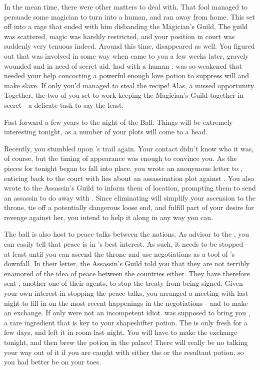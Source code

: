 \documentclass[char]{NeptuneBall}
\begin{document}
In the mean time, there were other matters to deal with. That fool \cAriel{} managed to persuade some magician to turn \cAriel{\them} into a human, and ran away from home. This set \cKing{} off into a rage that ended with him disbanding the Magician's Guild. The guild was scattered, magic was harshly restricted, and your position in court was suddenly very tenuous indeed. Around this time, \cWitch{} disappeared as well. You figured out that \cWitch{\they} was involved in some way when \cWitch{\they} came to you a few weeks later, gravely wounded and in need of secret aid. \cWitch{\They} had with \cWitch{\them} a human \cSlave{\prince}. \cWitch{} was so weakened that \cWitch{\they} needed your help concocting a powerful enough love potion to suppress \cSlave{\their} will and make \cSlave{\them} \cWitch{\them} slave. If only you'd managed to steal the recipe! Alas, a missed opportunity. Together, the two of you set to work keeping the Magician's Guild together in secret - a delicate task to say the least.

Fast forward a few years to the night of the \cExExKing{} Ball. Things will be extremely interesting tonight, as a number of your plots will come to a head.

Recently, you stumbled upon \cQueen{}'s trail again. Your contact didn't know who it was, of course, but the timing of \cQueen{\their} appearance was enough to convince you. As the pieces for tonight began to fall into place, you wrote an anonymous letter to \cQueen{}, enticing \cQueen{\them} back to the court with lies about an assassination plot against \cKing{}. You also wrote to the Assassin's Guild to inform them of \cQueen{\their} location, prompting them to send an assassin to do away with \cQueen{}. Since eliminating \cQueen{} will simplify your ascension to the throne, tie off a potentially dangerous loose end, and fulfill part of your desire for revenge against her, you intend to help it along in any way you can.

The ball is also host to peace talks between the nations. As advisor to the \cKing{\King}, you can easily tell that peace is in \pAtlantis{}'s best interest. As such, it needs to be stopped - at least until you can ascend the throne and use negotiations as a tool of \pAtlantis{}'s downfall. In their letter, the Assassin's Guild told you that they are not terribly enamored of the idea of peace between the countries either. They have therefore sent \cSpy{}, another one of their agents, to stop the treaty from being signed. Given your own interest in stopping the peace talks, you arranged a meeting with \cSpy{\them} last night to fill \cSpy{\them} in on the most recent happenings in the negotiations - and to make an exchange. If only \cSpy{} were not an incompetent idiot.  \cSpy{\They} was supposed to bring you \iHemlock{\MYname}, a rare ingredient that is key to your shapeshifter potion. The \iHemlock{\MYname} is only fresh for a few days, and \cSpy{} left it in \cSpy{\them} room last night. You will have to make the exchange tonight, and then brew the potion in the palace! There will really be no talking your way out of it if you are caught with either the \iHemlock{\MYname} or the resultant potion, so you had better be on your toes.
\end{document}
